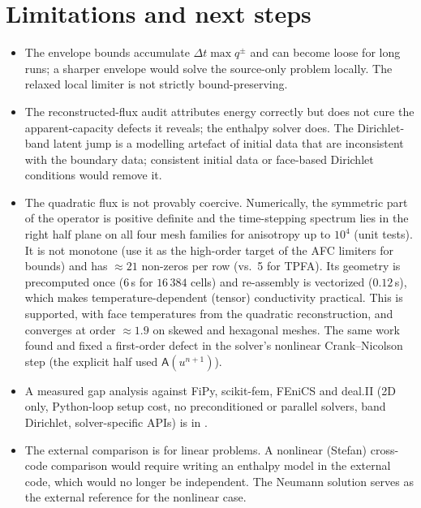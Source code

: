 \documentclass[11pt]{article}
\numberwithin{equation}{section}
\theoremstyle{remark}
\begin{document}
\section{Limitations and next steps}
\begin{itemize}[leftmargin=*]
\item The envelope bounds accumulate $\Delta t\max q^\pm$ and can become loose
  for long runs; a sharper envelope would solve the source-only problem
  locally.  The relaxed local limiter is not strictly bound-preserving.
\item The reconstructed-flux audit attributes energy correctly but does not
  cure the apparent-capacity defects it reveals; the enthalpy solver does.  The
  Dirichlet-band latent jump is a modelling artefact of initial data that are
  inconsistent with the boundary data; consistent initial data or face-based
  Dirichlet conditions would remove it.
\item The quadratic flux is not provably coercive.  Numerically, the symmetric
  part of the operator is positive definite and the time-stepping spectrum lies
  in the right half plane on all four mesh families for anisotropy up to
  $10^4$ (unit tests).  It is not monotone (use it as the high-order target of
  the AFC limiters for bounds) and has $\approx21$ non-zeros per row (vs.\ 5 for
  TPFA).  Its geometry is precomputed once ($6$\,s for $16\,384$ cells) and
  re-assembly is vectorized ($0.12$\,s), which makes temperature-dependent
  (tensor) conductivity practical.  This is supported, with face temperatures
  from the quadratic reconstruction, and converges at order $\approx1.9$ on skewed
  and hexagonal meshes.  The same work found and fixed a first-order defect in
  the solver's nonlinear Crank--Nicolson step (the explicit half used
  $\mathsf A(u^{n+1})$).
\item A measured gap analysis against FiPy, scikit-fem, FEniCS and deal.II
  (2D only, Python-loop setup cost, no preconditioned or parallel solvers,
  band Dirichlet, solver-specific APIs) is in
  .
\item The external comparison is for linear problems.  A nonlinear (Stefan)
  cross-code comparison would require writing an enthalpy model in the
  external code, which would no longer be independent.  The Neumann solution
  serves as the external reference for the nonlinear case.
\end{itemize}
\end{document}
